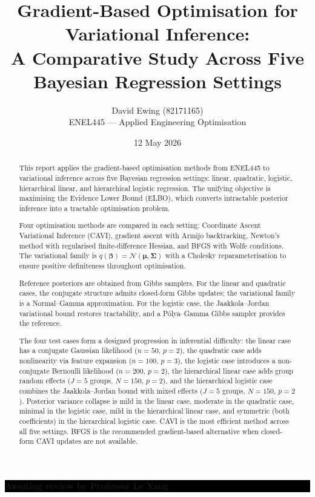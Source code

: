 \documentclass[11pt,a4paper]{article}
\title{
Gradient-Based Optimisation for Variational Inference:\\
A Comparative Study Across Five Bayesian Regression Settings
}
\author{
  David Ewing (82171165)\\
  ENEL445 --- Applied Engineering Optimisation
}
\date{12 May 2026}
\newcommand{\N}{\mathcal{N}}
\begin{document}
\maketitle

\begin{abstract}
\setlength{\parindent}{0pt}
\setlength{\parskip}{0.7em}

This report applies the gradient-based optimisation methods from ENEL445 to variational
inference across five Bayesian regression settings: linear, quadratic, logistic,
hierarchical linear, and hierarchical logistic regression.
The unifying objective is maximising the Evidence Lower Bound (ELBO), which converts
intractable posterior inference into a tractable optimisation problem.

Four optimisation methods are compared in each setting: Coordinate Ascent Variational
Inference (CAVI), gradient ascent with Armijo backtracking, Newton's method with
regularised finite-difference Hessian, and BFGS with Wolfe conditions.
The variational family is $q(\bm{\beta}) = \N(\bm{\mu}, \bm{\Sigma})$ with a Cholesky
reparameterisation to ensure positive definiteness throughout optimisation.

Reference posteriors are obtained from Gibbs samplers.
For the linear and quadratic cases, the conjugate structure admits closed-form Gibbs
updates; the variational family is a Normal--Gamma approximation.
For the logistic case, the Jaakkola--Jordan \parencite{Jaakkola2000} variational bound
restores tractability, and a P\'{o}lya--Gamma Gibbs sampler \parencite{Polson2013}
provides the reference.

The four test cases form a designed progression in inferential difficulty:
the linear case has a conjugate Gaussian likelihood ($n=50$, $p=2$),
the quadratic case adds nonlinearity via feature expansion ($n=100$, $p=3$),
the logistic case introduces a non-conjugate Bernoulli likelihood ($n=200$, $p=2$),
the hierarchical linear case adds group random effects ($J=5$ groups, $N=150$, $p=2$),
and the hierarchical logistic case combines the Jaakkola--Jordan bound with mixed effects
($J=5$ groups, $N=150$, $p=2$).
Posterior variance collapse is mild in the linear case, moderate in the quadratic case,
minimal in the logistic case, mild in the hierarchical linear case, and symmetric
(both coefficients) in the hierarchical logistic case.
CAVI is the most efficient method across all five settings.
BFGS is the recommended gradient-based alternative when closed-form CAVI updates are
not available.
\end{abstract}

\vspace{2em}

\noindent\colorbox{black}{%
  \parbox{\dimexpr\linewidth-2\fboxsep}{%
    \centering
    \vspace{8pt}
    {\color{white}\large\bfseries Awaiting review by Professor Le Yang}%
    \vspace{8pt}
  }%
}
\end{document}
